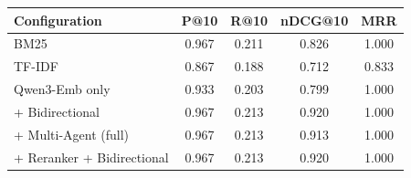 \begin{tabular}{lcccc}
\toprule
Configuration & P@10 & R@10 & nDCG@10 & MRR \\
\midrule
BM25 & 0.967 & 0.211 & 0.826 & 1.000 \\
TF-IDF & 0.867 & 0.188 & 0.712 & 0.833 \\
Qwen3-Emb only & 0.933 & 0.203 & 0.799 & 1.000 \\
+ Bidirectional & 0.967 & 0.213 & 0.920 & 1.000 \\
+ Multi-Agent (full) & 0.967 & 0.213 & 0.913 & 1.000 \\
+ Reranker + Bidirectional & 0.967 & 0.213 & 0.920 & 1.000 \\
\bottomrule
\end{tabular}